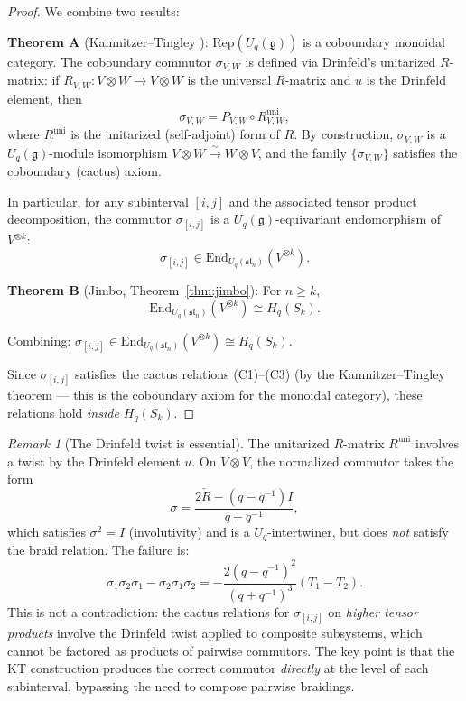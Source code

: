 \documentclass[11pt]{article}
\theoremstyle{remark}
\newtheorem{remark}[theorem]{Remark}
\newcommand{\Rep}{\mathrm{Rep}}
\newcommand{\End}{\mathrm{End}}
\begin{document}
\begin{proof}
We combine two results:

\textbf{Theorem A} (Kamnitzer--Tingley \cite{KT2009}):
$\Rep(U_q(\mathfrak{g}))$ is a coboundary monoidal category.
The coboundary commutor $\sigma_{V,W}$ is defined via Drinfeld's unitarized $R$-matrix:
if $R_{V,W}: V \otimes W \to V \otimes W$ is the universal $R$-matrix and
$u$ is the Drinfeld element, then
\[
  \sigma_{V,W} = P_{V,W} \circ R_{V,W}^{\mathrm{uni}},
\]
where $R^{\mathrm{uni}}$ is the unitarized (self-adjoint) form of $R$.
By construction, $\sigma_{V,W}$ is a $U_q(\mathfrak{g})$-module isomorphism
$V \otimes W \xrightarrow{\sim} W \otimes V$, and the family $\{\sigma_{V,W}\}$
satisfies the coboundary (cactus) axiom.

In particular, for any subinterval $[i,j]$ and the associated tensor product
decomposition, the commutor $\sigma_{[i,j]}$ is a $U_q(\mathfrak{g})$-equivariant
endomorphism of $V^{\otimes k}$:
\[
  \sigma_{[i,j]} \in \End_{U_q(\mathfrak{sl}_n)}(V^{\otimes k}).
\]

\textbf{Theorem B} (Jimbo, Theorem~\ref{thm:jimbo}):
For $n \ge k$,
\[
  \End_{U_q(\mathfrak{sl}_n)}(V^{\otimes k}) \cong H_q(S_k).
\]

Combining: $\sigma_{[i,j]} \in \End_{U_q(\mathfrak{sl}_n)}(V^{\otimes k}) \cong H_q(S_k)$.

Since $\sigma_{[i,j]}$ satisfies the cactus relations (C1)--(C3)
(by the Kamnitzer--Tingley theorem --- this is the coboundary axiom for
the monoidal category), these relations hold \emph{inside $H_q(S_k)$}.
\end{proof}

\begin{remark}[The Drinfeld twist is essential]
\label{rmk:drinfeld}
The unitarized $R$-matrix $R^{\mathrm{uni}}$ involves a twist by the Drinfeld element $u$.
On $V \otimes V$, the normalized commutor takes the form
\[
  \sigma = \frac{2\check{R} - (q - q^{-1})I}{q + q^{-1}},
\]
which satisfies $\sigma^2 = I$ (involutivity) and is a $U_q$-intertwiner,
but does \emph{not} satisfy the braid relation. The failure is:
\[
  \sigma_1 \sigma_2 \sigma_1 - \sigma_2 \sigma_1 \sigma_2 = -\frac{2(q-q^{-1})^2}{(q+q^{-1})^3}(T_1 - T_2).
\]
This is not a contradiction: the cactus relations for $\sigma_{[i,j]}$ on
\emph{higher tensor products} involve the Drinfeld twist applied to composite
subsystems, which cannot be factored as products of pairwise commutors.
The key point is that the KT construction produces the correct commutor
\emph{directly} at the level of each subinterval, bypassing the need to
compose pairwise braidings.
\end{remark}
\end{document}
